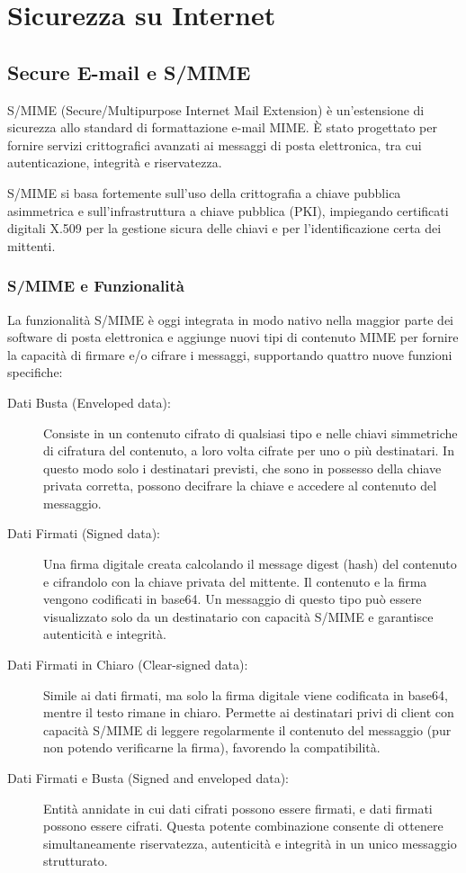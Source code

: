 \chapter{Sicurezza su Internet}

\section{Secure E-mail e S/MIME}

S/MIME (Secure/Multipurpose Internet Mail Extension) è un'estensione di sicurezza allo standard di formattazione e-mail MIME. È stato progettato per fornire servizi crittografici avanzati ai messaggi di posta elettronica, tra cui autenticazione, integrità e riservatezza. 

\begin{notebox}
S/MIME si basa fortemente sull’uso della crittografia a chiave pubblica asimmetrica e sull'infrastruttura a chiave pubblica (PKI), impiegando certificati digitali X.509 per la gestione sicura delle chiavi e per l'identificazione certa dei mittenti.
\end{notebox}

\subsection{S/MIME e Funzionalità}
La funzionalità S/MIME è oggi integrata in modo nativo nella maggior parte dei software di posta elettronica e aggiunge nuovi tipi di contenuto MIME per fornire la capacità di firmare e/o cifrare i messaggi, supportando quattro nuove funzioni specifiche:

\begin{description}
    \item[Dati Busta (Enveloped data):] Consiste in un contenuto cifrato di qualsiasi tipo e nelle chiavi simmetriche di cifratura del contenuto, a loro volta cifrate per uno o più destinatari. In questo modo solo i destinatari previsti, che sono in possesso della chiave privata corretta, possono decifrare la chiave e accedere al contenuto del messaggio.
    \item[Dati Firmati (Signed data):] Una firma digitale creata calcolando il message digest (hash) del contenuto e cifrandolo con la chiave privata del mittente. Il contenuto e la firma vengono codificati in base64. Un messaggio di questo tipo può essere visualizzato solo da un destinatario con capacità S/MIME e garantisce autenticità e integrità.
    \item[Dati Firmati in Chiaro (Clear-signed data):] Simile ai dati firmati, ma solo la firma digitale viene codificata in base64, mentre il testo rimane in chiaro. Permette ai destinatari privi di client con capacità S/MIME di leggere regolarmente il contenuto del messaggio (pur non potendo verificarne la firma), favorendo la compatibilità.
    \item[Dati Firmati e Busta (Signed and enveloped data):] Entità annidate in cui dati cifrati possono essere firmati, e dati firmati possono essere cifrati. Questa potente combinazione consente di ottenere simultaneamente riservatezza, autenticità e integrità in un unico messaggio strutturato.
\end{description}

